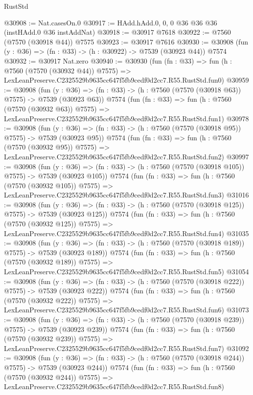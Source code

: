 \begin{lexlean}{RustStd}
\begin{coremodule}
@30908 := Nat.casesOn.{0}
@30917 := HAdd.hAdd.{0, 0, 0} @36 @36 @36 (instHAdd.{0} @36 instAddNat)
@30918 := @30917 @7618
@30922 := @7560 (@7570 (@30918 @44)) @7575
@30923 := @30917 @7616
@30930 := @30908 (fun (y : @36) => (fn : @33) -> (h : @30922) -> @7539 (@30923 @44)) @7574
@30932 := @30917 Nat.zero
@30940 := @30930
    (fun (fn : @33) =>
    fun (h : @7560 (@7570 (@30932 @44)) @7575) =>
    LexLeanPreserve.C2325529b9635cc647f5fb9cedf0d2cc7.R55.RustStd.fun0)
@30959 := @30908
    (fun (y : @36) => (fn : @33) -> (h : @7560 (@7570 (@30918 @63)) @7575) -> @7539 (@30923 @63))
    @7574
    (fun (fn : @33) =>
    fun (h : @7560 (@7570 (@30932 @63)) @7575) =>
    LexLeanPreserve.C2325529b9635cc647f5fb9cedf0d2cc7.R55.RustStd.fun1)
@30978 := @30908
    (fun (y : @36) => (fn : @33) -> (h : @7560 (@7570 (@30918 @95)) @7575) -> @7539 (@30923 @95))
    @7574
    (fun (fn : @33) =>
    fun (h : @7560 (@7570 (@30932 @95)) @7575) =>
    LexLeanPreserve.C2325529b9635cc647f5fb9cedf0d2cc7.R55.RustStd.fun2)
@30997 := @30908
    (fun (y : @36) => (fn : @33) -> (h : @7560 (@7570 (@30918 @105)) @7575) -> @7539 (@30923 @105))
    @7574
    (fun (fn : @33) =>
    fun (h : @7560 (@7570 (@30932 @105)) @7575) =>
    LexLeanPreserve.C2325529b9635cc647f5fb9cedf0d2cc7.R55.RustStd.fun3)
@31016 := @30908
    (fun (y : @36) => (fn : @33) -> (h : @7560 (@7570 (@30918 @125)) @7575) -> @7539 (@30923 @125))
    @7574
    (fun (fn : @33) =>
    fun (h : @7560 (@7570 (@30932 @125)) @7575) =>
    LexLeanPreserve.C2325529b9635cc647f5fb9cedf0d2cc7.R55.RustStd.fun4)
@31035 := @30908
    (fun (y : @36) => (fn : @33) -> (h : @7560 (@7570 (@30918 @189)) @7575) -> @7539 (@30923 @189))
    @7574
    (fun (fn : @33) =>
    fun (h : @7560 (@7570 (@30932 @189)) @7575) =>
    LexLeanPreserve.C2325529b9635cc647f5fb9cedf0d2cc7.R55.RustStd.fun5)
@31054 := @30908
    (fun (y : @36) => (fn : @33) -> (h : @7560 (@7570 (@30918 @222)) @7575) -> @7539 (@30923 @222))
    @7574
    (fun (fn : @33) =>
    fun (h : @7560 (@7570 (@30932 @222)) @7575) =>
    LexLeanPreserve.C2325529b9635cc647f5fb9cedf0d2cc7.R55.RustStd.fun6)
@31073 := @30908
    (fun (y : @36) => (fn : @33) -> (h : @7560 (@7570 (@30918 @239)) @7575) -> @7539 (@30923 @239))
    @7574
    (fun (fn : @33) =>
    fun (h : @7560 (@7570 (@30932 @239)) @7575) =>
    LexLeanPreserve.C2325529b9635cc647f5fb9cedf0d2cc7.R55.RustStd.fun7)
@31092 := @30908
    (fun (y : @36) => (fn : @33) -> (h : @7560 (@7570 (@30918 @244)) @7575) -> @7539 (@30923 @244))
    @7574
    (fun (fn : @33) =>
    fun (h : @7560 (@7570 (@30932 @244)) @7575) =>
    LexLeanPreserve.C2325529b9635cc647f5fb9cedf0d2cc7.R55.RustStd.fun8)

\end{coremodule}
\end{lexlean}
